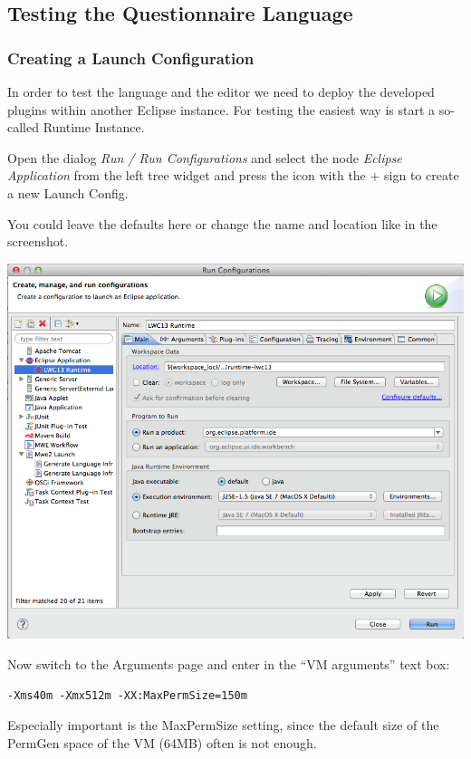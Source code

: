 \subsection{Testing the Questionnaire Language}

\subsubsection{Creating a Launch Configuration}

In order to test the language and the editor we need to deploy the developed
plugins within another Eclipse instance. For testing the easiest way is start a
so-called Runtime Instance.

Open the dialog \emph{Run / Run Configurations} and select the node \emph{Eclipse
Application} from the left tree widget and press the icon with the +
sign to create a new Launch Config.

You could leave the defaults here or change the name and location like in the
screenshot.

\includegraphics[width=17cm]{./images/chapter01/LaunchConfig.png}

Now switch to the Arguments page and enter in the ``VM arguments'' text box:
\begin{lstlisting}
-Xms40m -Xmx512m -XX:MaxPermSize=150m
\end{lstlisting}
Especially important is the MaxPermSize setting, since the default size of the
PermGen space of the VM (64MB) often is not enough.

